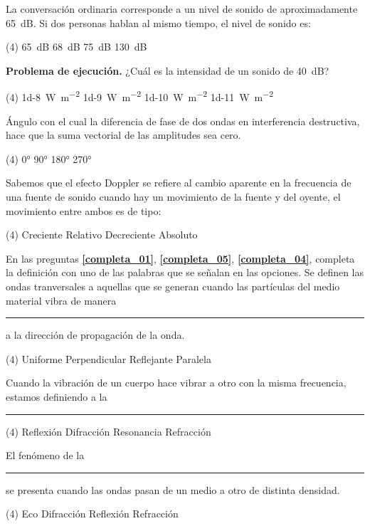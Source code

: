 \documentclass[12pt, letter]{exam}
\begin{document}
\begin{questions}
{}
    \question La conversación ordinaria corresponde a un nivel de sonido de aproximadamente \SI{65}{\dB}. Si dos personas hablan al mismo tiempo, el nivel de sonido es:
    \begin{tasks}(4)
        \task \SI{65}{\dB}
        \task \SI{68}{\dB}
        \task \SI{75}{\dB}
        \task \SI{130}{\dB}
    \end{tasks}
    \question \textbf{Problema de ejecución.} ¿Cuál es la intensidad de un sonido de \SI{40}{\dB}?
    \begin{tasks}(4)
        \task \SI{1d-8}{\watt\per\square\meter}
        \task \SI{1d-9}{\watt\per\square\meter}
        \task \SI{1d-10}{\watt\per\square\meter}
        \task \SI{1d-11}{\watt\per\square\meter}
    \end{tasks}
    \question Ángulo con el cual la diferencia de fase de dos ondas en interferencia destructiva, hace que la suma vectorial de las amplitudes sea cero.
    \begin{tasks}(4)
        \task \ang{0}
        \task \ang{90}
        \task \ang{180}
        \task \ang{270}
    \end{tasks}

    \newpage

    \question Sabemos que el efecto Doppler se refiere al cambio aparente en la frecuencia de una fuente
    de sonido cuando hay un movimiento de la fuente y del oyente, el movimiento entre ambos es de tipo:
    \begin{tasks}(4)
        \task Creciente
        \task Relativo
        \task Decreciente
        \task Absoluto
    \end{tasks}
    En las preguntas \textbf{\ref{completa_01}}, \textbf{\ref{completa_05}}, \textbf{\ref{completa_04}}, completa la definición con uno de las palabras que se señalan en las opciones.
    \question \label{completa_01} Se definen las ondas tranversales a aquellas que se generan cuando las partículas del medio material vibra de manera \rule{2cm}{0.3mm} a la dirección de propagación de la onda.
    \begin{tasks}(4)
        \task Uniforme
        \task Perpendicular
        \task Reflejante
        \task Paralela
    \end{tasks}
    \question \label{completa_05} Cuando la vibración de un cuerpo hace vibrar a otro con la misma frecuencia, estamos definiendo a la \rule{2cm}{0.3mm}
    \begin{tasks}(4)
        \task Reflexión
        \task Difracción
        \task Resonancia
        \task Refracción
    \end{tasks}
    \question \label{completa_04} El fenómeno de la \rule{2cm}{0.3mm} se presenta cuando las ondas pasan de un medio a otro de distinta densidad.
    \begin{tasks}(4)
        \task Eco
        \task Difracción
        \task Reflexión
        \task Refracción
    \end{tasks}


\end{questions}
\end{document}
